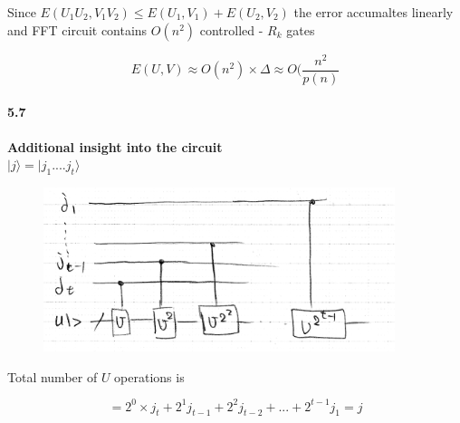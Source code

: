 Since $E(U_1 U_2, V_1 V_2) \le E(U_1, V_1) + E(U_2, V_2)$
 the error accumaltes linearly and FFT circuit contains $O(n^2)$ controlled - $R_k$ gates

 $$ E(U,V) \approx O(n^2) \times \Delta \approx O(\frac{n^2}{p(n)}$$
 

\paragraph{5.7} \textbf{Additional insight into the circuit}
\\

$|j\rangle = |j_1....j_t\rangle$

\begin{figure}[h!]
    \centering
    \includegraphics{Chapter 5/img5.7.png}
    
    \label{fig:my_label}
\end{figure}

Total number of $U$ operations is

$$ = 2^0 \times j_t + 2^1 j_{t-1} + 2^2 j_{t-2} +...+ 2^{t-1}j_1 = j$$



